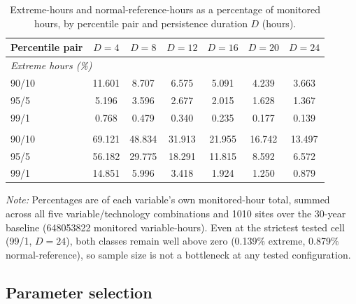 \begin{table}[H]
\centering
\begin{threeparttable}
\caption{Extreme-hours and normal-reference-hours as a percentage of monitored hours, by
percentile pair and persistence duration $D$ (hours).}
\label{tab:hours_pct}
\begin{tabular}{lcccccc}
\toprule
\textbf{Percentile pair} & \textbf{$D{=}4$} & \textbf{$D{=}8$} & \textbf{$D{=}12$} & \textbf{$D{=}16$} & \textbf{$D{=}20$} & \textbf{$D{=}24$} \\
\midrule
\multicolumn{7}{l}{\textit{Extreme hours (\%)}} \\
90/10 & \num{11.601} & \num{8.707}  & \num{6.575} & \num{5.091} & \num{4.239} & \num{3.663} \\
95/5  & \num{5.196}  & \num{3.596}  & \num{2.677} & \num{2.015} & \num{1.628} & \num{1.367} \\
99/1  & \num{0.768}  & \num{0.479}  & \num{0.340} & \num{0.235} & \num{0.177} & \num{0.139} \\
\addlinespace
\multicolumn{7}{l}{\textit{Normal-reference hours (\%)}} \\
90/10 & \num{69.121} & \num{48.834} & \num{31.913} & \num{21.955} & \num{16.742} & \num{13.497} \\
95/5  & \num{56.182} & \num{29.775} & \num{18.291} & \num{11.815} & \num{8.592}  & \num{6.572} \\
99/1  & \num{14.851} & \num{5.996}  & \num{3.418}  & \num{1.924}  & \num{1.250}  & \num{0.879} \\
\bottomrule
\end{tabular}
\begin{tablenotes}
\scriptsize
    \item \textit{Note:} Percentages are of each variable's own monitored-hour total, summed
    across all five variable/technology combinations and \num{1010} sites over the 30-year
    baseline (\num{648053822} monitored variable-hours). Even at the strictest tested cell
    (99/1, $D=24$), both classes remain well above zero (\num{0.139}\% extreme,
    \num{0.879}\% normal-reference), so sample size is not a bottleneck at any tested
    configuration.
\end{tablenotes}
\end{threeparttable}
\end{table}

\subsection{Parameter selection}\label{sec:param_selection}

